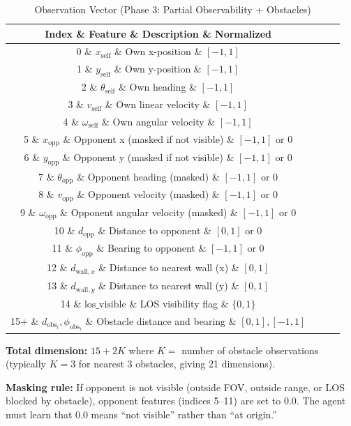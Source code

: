 \documentclass[11pt,a4paper]{report}
\begin{document}
\begin{table}[h]
\centering
\caption{Observation Vector (Phase 3: Partial Observability + Obstacles)}
\label{tab:obs}
\begin{tabular}{@{}clll@{}}
\toprule
\textbf{Index} \& \textbf{Feature} \& \textbf{Description} \& \textbf{Normalized} \\
\midrule
0 \& $x_{\text{self}}$ \& Own x-position \& $[-1, 1]$ \\
1 \& $y_{\text{self}}$ \& Own y-position \& $[-1, 1]$ \\
2 \& $\theta_{\text{self}}$ \& Own heading \& $[-1, 1]$ \\
3 \& $v_{\text{self}}$ \& Own linear velocity \& $[-1, 1]$ \\
4 \& $\omega_{\text{self}}$ \& Own angular velocity \& $[-1, 1]$ \\
5 \& $x_{\text{opp}}$ \& Opponent x (masked if not visible) \& $[-1, 1]$ or 0 \\
6 \& $y_{\text{opp}}$ \& Opponent y (masked if not visible) \& $[-1, 1]$ or 0 \\
7 \& $\theta_{\text{opp}}$ \& Opponent heading (masked) \& $[-1, 1]$ or 0 \\
8 \& $v_{\text{opp}}$ \& Opponent velocity (masked) \& $[-1, 1]$ or 0 \\
9 \& $\omega_{\text{opp}}$ \& Opponent angular velocity (masked) \& $[-1, 1]$ or 0 \\
10 \& $d_{\text{opp}}$ \& Distance to opponent \& $[0, 1]$ or 0 \\
11 \& $\phi_{\text{opp}}$ \& Bearing to opponent \& $[-1, 1]$ or 0 \\
12 \& $d_{\text{wall},x}$ \& Distance to nearest wall (x) \& $[0, 1]$ \\
13 \& $d_{\text{wall},y}$ \& Distance to nearest wall (y) \& $[0, 1]$ \\
14 \& $\text{los\_visible}$ \& LOS visibility flag \& $\{0, 1\}$ \\
15+ \& $d_{\text{obs}_i}, \phi_{\text{obs}_i}$ \& Obstacle distance and bearing \& $[0, 1], [-1, 1]$ \\
\bottomrule
\end{tabular}
\end{table}

\textbf{Total dimension:} $15 + 2K$ where $K =$ number of obstacle observations (typically $K = 3$ for nearest 3 obstacles, giving 21 dimensions).

\textbf{Masking rule:} If opponent is not visible (outside FOV, outside range, or LOS blocked by obstacle), opponent features (indices 5--11) are set to 0.0. The agent must learn that 0.0 means ``not visible'' rather than ``at origin.''
\end{document}
